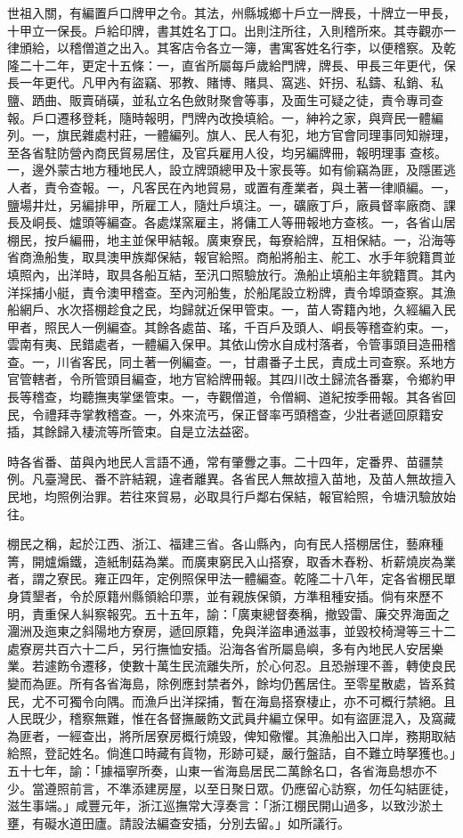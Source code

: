 \begin{pinyinscope}
世祖入關，有編置戶口牌甲之令。其法，州縣城鄉十戶立一牌長，十牌立一甲長，十甲立一保長。戶給印牌，書其姓名丁口。出則注所往，入則稽所來。其寺觀亦一律頒給，以稽僧道之出入。其客店令各立一簿，書寓客姓名行李，以便稽察。及乾隆二十二年，更定十五條：一，直省所屬每戶歲給門牌，牌長、甲長三年更代，保長一年更代。凡甲內有盜竊、邪教、賭博、賭具、窩逃、奸拐、私鑄、私銷、私鹽、跴曲、販賣硝磺，並私立名色斂財聚會等事，及面生可疑之徒，責令專司查報。戶口遷移登耗，隨時報明，門牌內改換填給。一，紳衿之家，與齊民一體編列。一，旗民雜處村莊，一體編列。旗人、民人有犯，地方官會同理事同知辦理，至各省駐防營內商民貿易居住，及官兵雇用人役，均另編牌冊，報明理事查核。一，邊外蒙古地方種地民人，設立牌頭總甲及十家長等。如有偷竊為匪，及隱匿逃人者，責令查報。一，凡客民在內地貿易，或置有產業者，與土著一律順編。一，鹽場井灶，另編排甲，所雇工人，隨灶戶填注。一，礦廠丁戶，廠員督率廠商、課長及峒長、爐頭等編查。各處煤窯雇主，將傭工人等冊報地方查核。一，各省山居棚民，按戶編冊，地主並保甲結報。廣東寮民，每寮給牌，互相保結。一，沿海等省商漁船隻，取具澳甲族鄰保結，報官給照。商船將船主、舵工、水手年貌籍貫並填照內，出洋時，取具各船互結，至汛口照驗放行。漁船止填船主年貌籍貫。其內洋採捕小艇，責令澳甲稽查。至內河船隻，於船尾設立粉牌，責令埠頭查察。其漁船網戶、水次搭棚趁食之民，均歸就近保甲管束。一，苗人寄籍內地，久經編入民甲者，照民人一例編查。其餘各處苗、瑤，千百戶及頭人、峒長等稽查約束。一，雲南有夷、民錯處者，一體編入保甲。其依山傍水自成村落者，令管事頭目造冊稽查。一，川省客民，同土著一例編查。一，甘肅番子土民，責成土司查察。系地方官管轄者，令所管頭目編查，地方官給牌冊報。其四川改土歸流各番寨，令鄉約甲長等稽查，均聽撫夷掌堡管束。一，寺觀僧道，令僧綱、道紀按季冊報。其各省回民，令禮拜寺掌教稽查。一，外來流丐，保正督率丐頭稽查，少壯者遞回原籍安插，其餘歸入棲流等所管束。自是立法益密。

時各省番、苗與內地民人言語不通，常有肇釁之事。二十四年，定番界、苗疆禁例。凡臺灣民、番不許結親，違者離異。各省民人無故擅入苗地，及苗人無故擅入民地，均照例治罪。若往來貿易，必取具行戶鄰右保結，報官給照，令塘汛驗放始往。

棚民之稱，起於江西、浙江、福建三省。各山縣內，向有民人搭棚居住，藝麻種箐，開爐煽鐵，造紙制菇為業。而廣東窮民入山搭寮，取香木舂粉、析薪燒炭為業者，謂之寮民。雍正四年，定例照保甲法一體編查。乾隆二十八年，定各省棚民單身賃墾者，令於原籍州縣領給印票，並有親族保領，方準租種安插。倘有來歷不明，責重保人糾察報究。五十五年，諭：「廣東總督奏稱，撤毀雷、廉交界海面之潿洲及迤東之斜陽地方寮房，遞回原籍，免與洋盜串通滋事，並毀校椅灣等三十二處寮房共百六十二戶，另行撫恤安插。沿海各省所屬島嶼，多有內地民人安居樂業。若遽飭令遷移，使數十萬生民流離失所，於心何忍。且恐辦理不善，轉使良民變而為匪。所有各省海島，除例應封禁者外，餘均仍舊居住。至零星散處，皆系貧民，尤不可獨令向隅。而漁戶出洋探捕，暫在海島搭寮棲止，亦不可概行禁絕。且人民既少，稽察無難，惟在各督撫嚴飭文武員弁編立保甲。如有盜匪混入，及窩藏為匪者，一經查出，將所居寮房概行燒毀，俾知儆懼。其漁船出入口岸，務期取結給照，登記姓名。倘進口時藏有貨物，形跡可疑，嚴行盤詰，自不難立時拏獲也。」五十七年，諭：「據福寧所奏，山東一省海島居民二萬餘名口，各省海島想亦不少。當遵照前言，不準添建房屋，以至日聚日眾。仍應留心訪察，勿任勾結匪徒，滋生事端。」咸豐元年，浙江巡撫常大淳奏言：「浙江棚民開山過多，以致沙淤土壅，有礙水道田廬。請設法編查安插，分別去留。」如所議行。


\end{pinyinscope}

